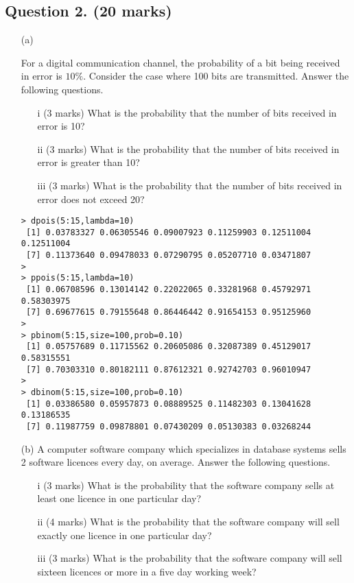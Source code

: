 

\newpage
\subsection*{Question 2. (20 marks) }
\begin{itemize}
\item[(a)]

For a digital communication channel, the probability of a bit being received in error is $10\%$. Consider the case where 100 bits are transmitted. Answer the following questions.

\begin{itemize}
\item[i] (3 marks)	What is the probability that the number of bits received in error is 10?
\item[ii] (3 marks) What is the probability that the number of bits received in error is greater than 10?
\item[iii] (3 marks)	What is the probability that the number of bits received in error does not exceed 20?
\end{itemize}
\begin{framed}
\begin{verbatim}
> dpois(5:15,lambda=10)
 [1] 0.03783327 0.06305546 0.09007923 0.11259903 0.12511004 0.12511004
 [7] 0.11373640 0.09478033 0.07290795 0.05207710 0.03471807
>
> ppois(5:15,lambda=10)
 [1] 0.06708596 0.13014142 0.22022065 0.33281968 0.45792971 0.58303975
 [7] 0.69677615 0.79155648 0.86446442 0.91654153 0.95125960
>
> pbinom(5:15,size=100,prob=0.10)
 [1] 0.05757689 0.11715562 0.20605086 0.32087389 0.45129017 0.58315551
 [7] 0.70303310 0.80182111 0.87612321 0.92742703 0.96010947
>
> dbinom(5:15,size=100,prob=0.10)
 [1] 0.03386580 0.05957873 0.08889525 0.11482303 0.13041628 0.13186535
 [7] 0.11987759 0.09878801 0.07430209 0.05130383 0.03268244

\end{verbatim}
\end{framed}
\newpage
\item[(b)]
A computer software company which specializes in database systems sells 2 software licences every day, on average. Answer the following questions.
    \begin{itemize}
    \item[i] (3 marks) What is the probability that the software company sells at least one licence in one particular day?
    \item[ii] (4 marks) What is the probability that the software company will sell exactly one licence in one particular day?
    \item[iii] (3 marks) What is the probability that the software company will sell sixteen licences or more in a five day working week?
    \end{itemize}
\end{itemize}
\bigskip


